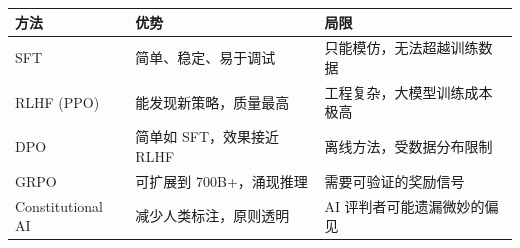 \begin{corebox}[后训练方法对比]
\begin{tabularx}{\linewidth}{l X X}
\toprule
\textbf{方法} & \textbf{优势} & \textbf{局限} \\
\midrule
SFT & 简单、稳定、易于调试 & 只能模仿，无法超越训练数据 \\
RLHF (PPO) & 能发现新策略，质量最高 & 工程复杂，大模型训练成本极高 \\
DPO & 简单如 SFT，效果接近 RLHF & 离线方法，受数据分布限制 \\
GRPO & 可扩展到 700B+，涌现推理 & 需要可验证的奖励信号 \\
Constitutional AI & 减少人类标注，原则透明 & AI 评判者可能遗漏微妙的偏见 \\
\bottomrule
\end{tabularx}
\end{corebox}


